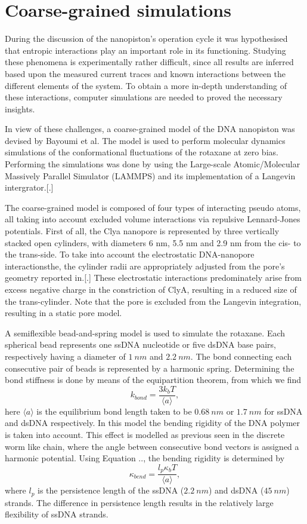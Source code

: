 \section{Coarse-grained simulations}

During the discussion of the nanopiston's operation cycle it was hypothesised
that entropic interactions play an important role in its functioning. Studying these
phenomena is experimentally rather difficult, since all results are inferred based upon
the measured current traces and known interactions between the different elements of the
system. To obtain a more in-depth understanding of these interactions, computer
simulations are needed to proved the necessary insights.

In view of these challenges, a coarse-grained model of the DNA nanopiston was devised by
Bayoumi et al. The model is used to perform molecular dynamics simulations of  the
conformational fluctuations of the rotaxane at zero bias. Performing the simulations was
done by using the Large-scale Atomic/Molecular Massively Parallel Simulator (LAMMPS) and
its implementation of a Langevin intergrator.[.]

The coarse-grained model is composed of four types of interacting pseudo
atoms, all taking into account excluded volume interactions via repulsive Lennard-Jones
potentials. First of all, the Clya nanopore is represented by three vertically stacked
open cylinders, with diameters 6 nm, 5.5 nm and 2.9 nm from the cis- to the trans-side.
To take into account the electrostatic DNA-nanopore interactionsthe, the cylinder radii
are appropriately adjusted from the pore's geometry reported in.[.]
These electrostatic interactions predominately arise from excess negative charge in the
constriction of ClyA, resulting in a reduced size of the trans-cylinder. Note that the
pore is excluded from the Langevin integration, resulting in a static pore model.

A semiflexible bead-and-spring model is used to simulate the rotaxane. Each spherical
bead represents one ssDNA nucleotide or five dsDNA base pairs, respectively having a
diameter of $1\ nm$ and  $2.2\ nm$. The bond connecting each consecutive pair of beads is
represented by a harmonic spring. Determining the bond stiffness is done by means of the
equipartition theorem, from which we find
  \begin{equation}
    k_{bond} = \frac{3 k_b T }{ \langle a \rangle},
  \end{equation}
here $\langle a \rangle$ is the equilibrium bond length taken to be $0.68\ nm$ or $1.7\
nm$ for ssDNA and dsDNA respectively. In this model the bending rigidity of the DNA
polymer is taken into account. This effect is modelled as previous seen in the discrete
worm like chain, where the angle between consecutive bond vectors is assigned a harmonic
potential. Using Equation .., the bending rigidity is determined by
  \begin{equation}
    \kappa_{bend} = \frac{l_{p} \kappa_b T}{\langle a \rangle},
  \end{equation}
  where $l_p$ is the persistence length of the ssDNA ($2.2\ nm$) and dsDNA ($45\ nm$)
strands. The difference in persistence length results in the relatively large flexibility
of ssDNA strands.

